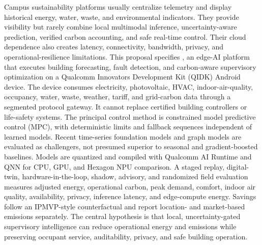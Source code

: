 Campus sustainability platforms usually centralize telemetry and display historical energy, water, waste, and environmental indicators. They provide visibility but rarely combine local multimodal inference, uncertainty-aware prediction, verified carbon accounting, and safe real-time control. Their cloud dependence also creates latency, connectivity, bandwidth, privacy, and operational-resilience limitations. This proposal specifies \system{}, an edge-AI platform that executes building forecasting, fault detection, and carbon-aware supervisory optimization on a Qualcomm Innovators Development Kit (QIDK) Android device. The device consumes electricity, photovoltaic, HVAC, indoor-air-quality, occupancy, water, waste, weather, tariff, and grid-carbon data through a segmented protocol gateway. It cannot replace certified building controllers or life-safety systems. The principal control method is constrained model predictive control (MPC), with deterministic limits and fallback sequences independent of learned models. Recent time-series foundation models and graph models are evaluated as challengers, not presumed superior to seasonal and gradient-boosted baselines. Models are quantized and compiled with Qualcomm AI Runtime and QNN for CPU, GPU, and Hexagon NPU comparison. A staged replay, digital-twin, hardware-in-the-loop, shadow, advisory, and randomized field evaluation measures adjusted energy, operational carbon, peak demand, comfort, indoor air quality, availability, privacy, inference latency, and edge-compute energy. Savings follow an IPMVP-style counterfactual and report location- and market-based emissions separately. The central hypothesis is that local, uncertainty-gated supervisory intelligence can reduce operational energy and emissions while preserving occupant service, auditability, privacy, and safe building operation.
